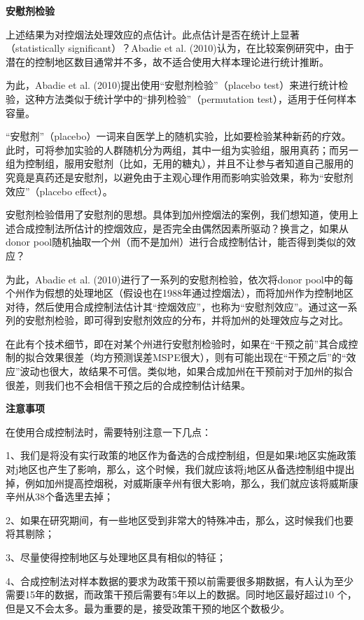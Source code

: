 \documentclass[cn,12pt,math=newtx,citestyle=gb7714-2015,bibstyle=gb7714-2015]{elegantbook}
\begin{document}
	\textbf{安慰剂检验}
	
	上述结果为对控烟法处理效应的点估计。此点估计是否在统计上显著（statistically significant）？Abadie et al. (2010)认为，在比较案例研究中，由于潜在的控制地区数目通常并不多，故不适合使用大样本理论进行统计推断。
	
	为此，Abadie et al. (2010)提出使用“安慰剂检验”（placebo test）来进行统计检验，这种方法类似于统计学中的“排列检验”（permutation test），适用于任何样本容量。
	
	“安慰剂”（placebo）一词来自医学上的随机实验，比如要检验某种新药的疗效。此时，可将参加实验的人群随机分为两组，其中一组为实验组，服用真药；而另一组为控制组，服用安慰剂（比如，无用的糖丸），并且不让参与者知道自己服用的究竟是真药还是安慰剂，以避免由于主观心理作用而影响实验效果，称为“安慰剂效应”（placebo effect）。
	
	安慰剂检验借用了安慰剂的思想。具体到加州控烟法的案例，我们想知道，使用上述合成控制法所估计的控烟效应，是否完全由偶然因素所驱动？换言之，如果从donor pool随机抽取一个州（而不是加州）进行合成控制估计，能否得到类似的效应？
	
	为此，Abadie et al. (2010)进行了一系列的安慰剂检验，依次将donor pool中的每个州作为假想的处理地区（假设也在1988年通过控烟法），而将加州作为控制地区对待，然后使用合成控制法估计其“控烟效应”，也称为“安慰剂效应”。通过这一系列的安慰剂检验，即可得到安慰剂效应的分布，并将加州的处理效应与之对比。
	
	在此有个技术细节，即在对某个州进行安慰剂检验时，如果在“干预之前”其合成控制的拟合效果很差（均方预测误差MSPE很大），则有可能出现在“干预之后”的“效应”波动也很大，故结果不可信。类似地，如果合成加州在干预前对于加州的拟合很差，则我们也不会相信干预之后的合成控制估计结果。
	
	\textbf{注意事项}
	
	在使用合成控制法时，需要特别注意一下几点：
	
	1、我们是将没有实行政策的地区作为备选的合成控制组，但是如果i地区实施政策对j地区也产生了影响，那么，这个时候，我们就应该将j地区从备选控制组中提出掉，例如加州提高控烟税，对威斯康辛州有很大影响，那么，我们就应该将威斯康辛州从38个备选里去掉；
	
	2、如果在研究期间，有一些地区受到非常大的特殊冲击，那么，这时候我们也要将其剔除；
	
	3、尽量使得控制地区与处理地区具有相似的特征；
	
	4、合成控制法对样本数据的要求为政策干预以前需要很多期数据，有人认为至少需要15年的数据，而政策干预后需要有5年以上的数据。同时地区最好超过10 个，但是又不会太多。最为重要的是，接受政策干预的地区个数极少。
	
\end{document}
